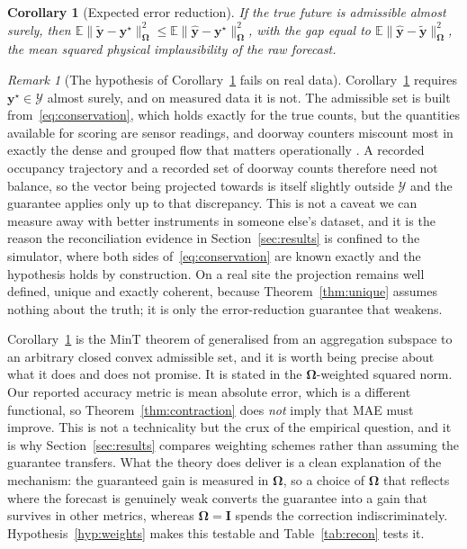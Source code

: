 \documentclass[11pt]{article}
\theoremstyle{plain}
\newtheorem{corollary}[theorem]{Corollary}
\theoremstyle{definition}
\theoremstyle{remark}
\newtheorem{remark}[theorem]{Remark}
\newcommand{\by}{\bm{y}}
\newcommand{\bOm}{\bm{\Omega}}
\newcommand{\yhat}{\hat{\by}}
\newcommand{\ytil}{\tilde{\by}}
\newcommand{\cY}{\mathcal{Y}}
\begin{document}
\begin{corollary}[Expected error reduction]
\label{cor:expected}
If the true future is admissible almost surely, then $\mathbb{E}\|\ytil-\by^{\star}\|_{\bOm}^{2} \le \mathbb{E}\|\yhat-\by^{\star}\|_{\bOm}^{2}$, with the gap equal to $\mathbb{E}\|\yhat-\ytil\|_{\bOm}^{2}$, the mean squared physical implausibility of the raw forecast.
\end{corollary}

\begin{remark}[The hypothesis of Corollary~\ref{cor:expected} fails on real data]
\label{rem:admissible}
Corollary~\ref{cor:expected} requires $\by^{\star} \in \cY$ almost surely, and on measured data it is not. The admissible set is built from~\eqref{eq:conservation}, which holds exactly for the true counts, but the quantities available for scoring are sensor readings, and doorway counters miscount most in exactly the dense and grouped flow that matters operationally \citep{brscic2013}. A recorded occupancy trajectory and a recorded set of doorway counts therefore need not balance, so the vector being projected towards is itself slightly outside $\cY$ and the guarantee applies only up to that discrepancy. This is not a caveat we can measure away with better instruments in someone else's dataset, and it is the reason the reconciliation evidence in Section~\ref{sec:results} is confined to the simulator, where both sides of~\eqref{eq:conservation} are known exactly and the hypothesis holds by construction. On a real site the projection remains well defined, unique and exactly coherent, because Theorem~\ref{thm:unique} assumes nothing about the truth; it is only the error-reduction guarantee that weakens.
\end{remark}

Corollary~\ref{cor:expected} is the MinT theorem of \citet{wickramasuriya2019mint} generalised from an aggregation subspace to an arbitrary closed convex admissible set, and it is worth being precise about what it does and does not promise. It is stated in the $\bOm$-weighted squared norm. Our reported accuracy metric is mean absolute error, which is a different functional, so Theorem~\ref{thm:contraction} does \emph{not} imply that MAE must improve. This is not a technicality but the crux of the empirical question, and it is why Section~\ref{sec:results} compares weighting schemes rather than assuming the guarantee transfers. What the theory does deliver is a clean explanation of the mechanism: the guaranteed gain is measured in $\bOm$, so a choice of $\bOm$ that reflects where the forecast is genuinely weak converts the guarantee into a gain that survives in other metrics, whereas $\bOm = \bm{I}$ spends the correction indiscriminately. Hypothesis~\ref{hyp:weights} makes this testable and Table~\ref{tab:recon} tests it.
\end{document}
